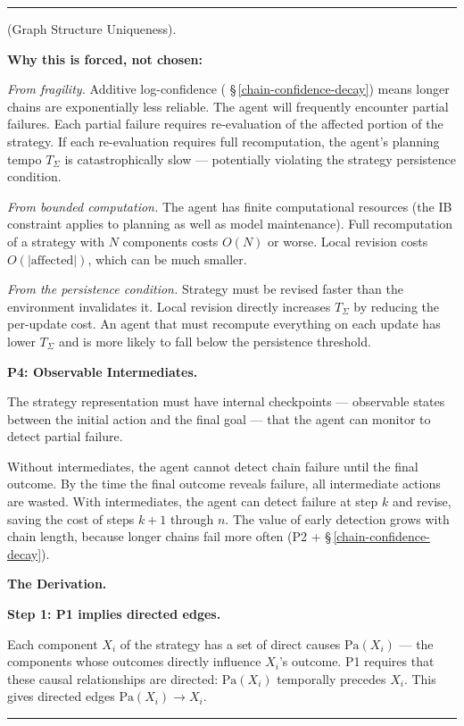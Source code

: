\documentclass[11pt,oneside]{article}
\newcounter{claim}[section]
\renewcommand{\theclaim}{\thesection.\arabic{claim}}
\newenvironment{segment}[2]{%
  \refstepcounter{claim}%
  \bigskip\noindent\hrule\smallskip
  \noindent{\bfseries #1~\theclaim}\enskip(#2).\par\smallskip
  \noindent\ignorespaces
}{%
  \par\smallskip\noindent\hrule\bigskip
}
\newenvironment{derivation}[1][]{\begin{segment}{Derivation}{#1}}{\end{segment}}
\begin{document}
\begin{derivation}[Graph Structure Uniqueness]
\textbf{Why this is forced, not chosen:}

\textit{From fragility.} Additive log-confidence ( \S\,\ref{chain-confidence-decay}) means longer chains are exponentially less reliable. The agent will frequently encounter partial failures. Each partial failure requires re-evaluation of the affected portion of the strategy. If each re-evaluation requires full recomputation, the agent's planning tempo $T_\Sigma$ is catastrophically slow — potentially violating the strategy persistence condition.

\textit{From bounded computation.} The agent has finite computational resources (the IB constraint applies to planning as well as model maintenance). Full recomputation of a strategy with $N$ components costs $O(N)$ or worse. Local revision costs $O(\lvert\text{affected}\rvert)$, which can be much smaller.

\textit{From the persistence condition.} Strategy must be revised faster than the environment invalidates it. Local revision directly increases $T_\Sigma$ by reducing the per-update cost. An agent that must recompute everything on each update has lower $T_\Sigma$ and is more likely to fall below the persistence threshold.


\medskip\noindent\textbf{P4: Observable Intermediates.}



The strategy representation must have internal checkpoints — observable states between the initial action and the final goal — that the agent can monitor to detect partial failure.

Without intermediates, the agent cannot detect chain failure until the final outcome. By the time the final outcome reveals failure, all intermediate actions are wasted. With intermediates, the agent can detect failure at step $k$ and revise, saving the cost of steps $k+1$ through $n$. The value of early detection grows with chain length, because longer chains fail more often (P2 + \S\,\ref{chain-confidence-decay}).


\medskip\noindent\textbf{The Derivation.}



\medskip\noindent\textbf{Step 1: P1 implies directed edges.}


Each component $X_i$ of the strategy has a set of direct causes $\text{Pa}(X_i)$ — the components whose outcomes directly influence $X_i$'s outcome. P1 requires that these causal relationships are directed: $\text{Pa}(X_i)$ temporally precedes $X_i$. This gives directed edges $\text{Pa}(X_i) \to X_i$.



\end{derivation}
\end{document}

